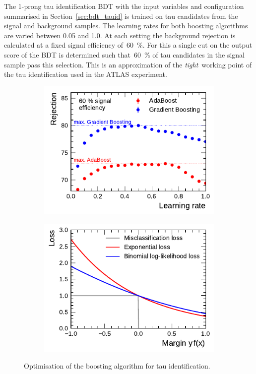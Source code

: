 The 1-prong tau identification BDT with the input variables and configuration
summarised in Section~\ref{sec:bdt_tauid} is trained on tau candidates from the
signal and background samples. The learning rates for both boosting algorithms
are varied between 0.05 and 1.0. At each setting the background rejection is
calculated at a fixed signal efficiency of~\SI{60}{\percent}. For this a single
cut on the output score of the BDT is determined such that~\SI{60}{\percent} of
tau candidates in the signal sample pass this selection. This is an
approximation of the \emph{tight}~working point of the tau identification used
in the ATLAS experiment.

\begin{figure}[htb]
  \centering
  \begin{subfigure}[t]{0.48\textwidth}
    \centering
    \includegraphics{./figures/bdt_perf/boosting.pdf}
    \label{fig:bdt_boosting_alg}
  \end{subfigure}\hfill
  \begin{subfigure}[t]{0.48\textwidth}
    \centering \includegraphics{./figures/theory/boosting_loss.pdf}
    \label{fig:boosting_loss}
  \end{subfigure}
  \caption{Optimisation of the boosting algorithm for tau identification.}
\end{figure}


